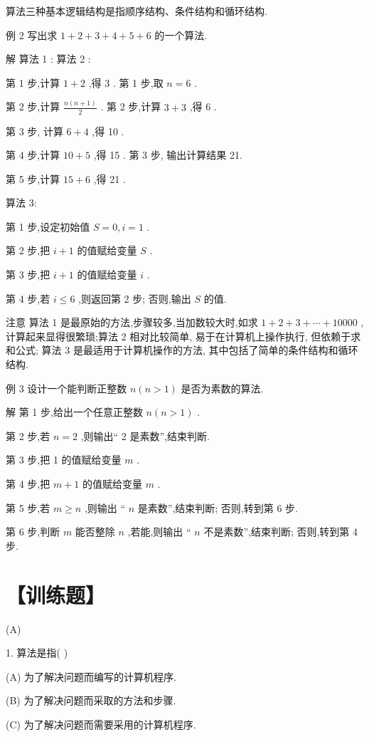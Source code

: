 \documentclass[10pt]{article}
\begin{document}
算法三种基本逻辑结构是指顺序结构、条件结构和循环结构.

例 2 写出求 \(1 + 2 + 3 + 4 + 5 + 6\) 的一个算法.

解 算法 1 : 算法 2 :

第 1 步,计算 \(1 + 2\) ,得 3 . 第 1 步,取 \(n = 6\) .

第 2 步,计算 \(\frac{n\left( {n + 1}\right) }{2}\) . 第 2 步,计算 \(3 + 3\) ,得 6 .

第 3 步, 计算 \(6 + 4\) ,得 10 .

第 4 步,计算 \({10} + 5\) ,得 15 . 第 3 步, 输出计算结果 21.

第 5 步,计算 \({15} + 6\) ,得 21 .

算法 3:

第 1 步,设定初始值 \(S = 0,i = 1\) .

第 2 步,把 \(i + 1\) 的值赋给变量 \(S\) .

第 3 步,把 \(i + 1\) 的值赋给变量 \(i\) .

第 4 步,若 \(i \leq  6\) ,则返回第 2 步; 否则,输出 \(S\) 的值.

注意 算法 1 是最原始的方法,步骤较多,当加数较大时,如求 \(1 + 2 + 3 + \cdots  + {10000}\) ,计算起来显得很繁琐;算法 2 相对比较简单, 易于在计算机上操作执行, 但依赖于求和公式; 算法 3 是最适用于计算机操作的方法, 其中包括了简单的条件结构和循环结构.

例 3 设计一个能判断正整数 \(n\left( {n > 1}\right)\) 是否为素数的算法.

解 第 1 步,给出一个任意正整数 \(n\left( {n > 1}\right)\) .

第 2 步,若 \(n = 2\) ,则输出“ 2 是素数”,结束判断.

第 3 步,把 1 的值赋给变量 \(m\) .

第 4 步,把 \(m + 1\) 的值赋给变量 \(m\) .

第 5 步,若 \(m \geq  n\) ,则输出 “ \(n\) 是素数”,结束判断; 否则,转到第 6 步.

第 6 步,判断 \(m\) 能否整除 \(n\) ,若能,则输出 “ \(n\) 不是素数”,结束判断; 否则,转到第 4 步.

\section*{【训练题】}

(A)

1. 算法是指( )

(A) 为了解决问题而编写的计算机程序.

(B) 为了解决问题而采取的方法和步骤.

(C) 为了解决问题而需要采用的计算机程序.
\end{document}
